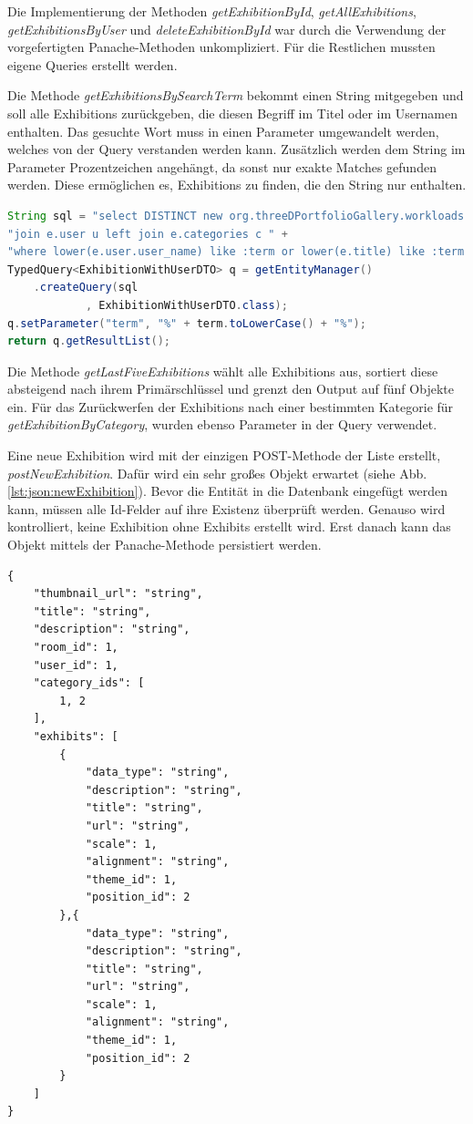 Die Implementierung der Methoden \emph{getExhibitionById}, \emph{getAllExhibitions}, \emph{getExhibitionsByUser} und \emph{deleteExhibitionById} war durch die Verwendung der vorgefertigten Panache-Methoden unkompliziert. 
Für die Restlichen mussten eigene Queries erstellt werden. 

Die Methode \emph{getExhibitionsBySearchTerm} bekommt einen String mitgegeben und soll alle Exhibitions zurückgeben, die diesen Begriff im Titel oder im Usernamen enthalten. 
Das gesuchte Wort muss in einen Parameter umgewandelt werden, welches von der Query verstanden werden kann. 
Zusätzlich werden dem String im Parameter Prozentzeichen angehängt, da sonst nur exakte Matches gefunden werden.
Diese ermöglichen es, Exhibitions zu finden, die den String nur enthalten. 

\begin{lstlisting}[label=lst:sql:getExhibitionsBySearchTerm, language=Java, caption=Exhibition Query für getExhibitionsBySearchTerm]
String sql = "select DISTINCT new org.threeDPortfolioGallery.workloads.dto.ExhibitionWithUserDTO(e, u.user_name, u.icon_url) from Exhibition e " +
"join e.user u left join e.categories c " +
"where lower(e.user.user_name) like :term or lower(e.title) like :term order by e.id desc";
TypedQuery<ExhibitionWithUserDTO> q = getEntityManager()
    .createQuery(sql
            , ExhibitionWithUserDTO.class);
q.setParameter("term", "%" + term.toLowerCase() + "%");
return q.getResultList();
\end{lstlisting}

Die Methode \emph{getLastFiveExhibitions} wählt alle Exhibitions aus, sortiert diese absteigend nach ihrem Primärschlüssel und grenzt den Output auf fünf Objekte ein. 
Für das Zurückwerfen der Exhibitions nach einer bestimmten Kategorie für \emph{getExhibitionByCategory}, wurden ebenso Parameter in der Query verwendet. 

Eine neue Exhibition wird mit der einzigen POST-Methode der Liste erstellt, \emph{postNewExhibition}. 
Dafür wird ein sehr großes Objekt erwartet (siehe Abb. \ref{lst:json:newExhibition}). 
Bevor die Entität in die Datenbank eingefügt werden kann, müssen alle Id-Felder auf ihre Existenz überprüft werden. 
Genauso wird kontrolliert, keine Exhibition ohne Exhibits erstellt wird. 
Erst danach kann das Objekt mittels der Panache-Methode persistiert werden. 

\begin{lstlisting}[label=lst:json:newExhibition, caption=Beispiel für neue Exhibition]
{
    "thumbnail_url": "string",
    "title": "string",
    "description": "string",
    "room_id": 1,
    "user_id": 1,
    "category_ids": [
        1, 2
    ],
    "exhibits": [
        {
            "data_type": "string",
            "description": "string",
            "title": "string",
            "url": "string",
            "scale": 1,
            "alignment": "string",
            "theme_id": 1,
            "position_id": 2
        },{
            "data_type": "string",
            "description": "string",
            "title": "string",
            "url": "string",
            "scale": 1,
            "alignment": "string",
            "theme_id": 1,
            "position_id": 2
        }
    ]
}
\end{lstlisting}


